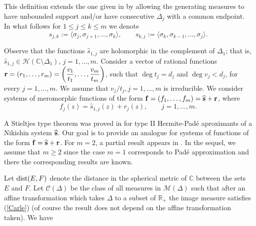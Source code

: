 \documentclass[10pt,a4paper]{article}
\theoremstyle{definition}
\theoremstyle{remark}
\numberwithin{equation}{section}
\begin{document}
This definition extends the one given in  \cite{Nik} by allowing the generating measures to have unbounded support and/or have consecutive $\Delta_j$ with a common endpoint.   In what follows for $1\leq j\leq k\leq m$ we denote
\[ s_{j,k} := \langle \sigma_j,\sigma_{j+1},\ldots,\sigma_k \rangle, \qquad s_{k,j} := \langle \sigma_k,\sigma_{k-1},\ldots,\sigma_j \rangle.
\]

Observe that the functions $\widehat{s}_{1,j}$ are holomorphic in the complement of $\Delta_1$; that is,  $\widehat{s}_{1,j}\in {\mathcal{H}}\left( {\mathbb{C}}\setminus \Delta_1\right)$, $j=1,\ldots,m$. Consider a vector of rational functions ${\bf r}=(r_1,\ldots,r_m)=\left(\displaystyle \frac{v_{1}}{t_{1}},\ldots, \frac{v_{m}}{t_{m}}\right)$, such that $\deg t_{j}=d_{j}$ and  $\deg v_{j}<d_{j}$, for every $j=1,\ldots,m$. We assume that $v_j/t_j, j=1,\ldots,m$ is irreducible.  We consider systems of meromorphic functions  of the form  ${\bf f}=(f_{1},\ldots, f_{m}) = \widehat{\bf s} + {\bf r}$, where
\begin{equation}\label{fs}
f_{j}(z)=\widehat{s}_{1,j}(z)+ r_{j}(z), \qquad j=1,\ldots,m.
\end{equation}


A  Stieltjes type theorem was proved in \cite{Bus} for type II Hermite-Pad\'e aproximants of a Nikishin system $\widehat{\bf s}$. Our goal is to provide an analogue for systems of functions of the form ${\bf f} = \widehat{\bf s} + {\bf r}$. For $m=2$, a partial result appears in \cite{Bus2}. In the sequel, we assume that $m\geq 2$ since the case $m=1$ corresponds to Pad\'e approximation and there the corresponding results are known.

Let $\mbox{\rm dist}(E,F)$ denote the distance in the spherical metric of $\mathbb{C}$ between the sets $E$ and $F$. Let $\mathcal{C}(\Delta)$ be the class of all measures in $\mathcal{M}(\Delta)$ such that after an affine transformation which takes $\Delta$ to a subset of $\mathbb{R}_+$ the image measure satisfies (\ref{Carle}) (of course the result does not depend on the affine transformation taken). We have
\end{document}
